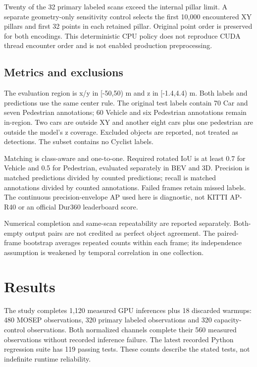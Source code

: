 \documentclass[11pt,a4paper]{article}
\begin{document}
Twenty of the 32 primary labeled scans exceed the internal pillar limit. A
separate geometry-only sensitivity control selects the first 10,000 encountered
XY pillars and first 32 points in each retained pillar. Original point order is
preserved for both encodings. This deterministic CPU policy does not reproduce
CUDA thread encounter order and is not enabled production preprocessing.

\subsection{Metrics and exclusions}
The evaluation region is x/y in [-50,50) m and z in [-1.4,4.4) m. Both labels and
predictions use the same center rule. The original test labels contain 70 Car
and seven Pedestrian annotations; 60 Vehicle and six Pedestrian annotations
remain in-region. Two cars are outside XY and another eight cars plus one
pedestrian are outside the model's z coverage. Excluded objects are reported,
not treated as detections. The subset contains no Cyclist labels.

Matching is class-aware and one-to-one. Required rotated IoU is at least 0.7
for Vehicle and 0.5 for Pedestrian, evaluated separately in BEV and 3D.
Precision is matched predictions divided by counted predictions; recall is
matched annotations divided by counted annotations. Failed frames retain
missed labels. The continuous precision-envelope AP used here is diagnostic,
not KITTI AP-R40 or an official Dur360 leaderboard score.

Numerical completion and same-scan repeatability are reported separately.
Both-empty output pairs are not credited as perfect object agreement. The
paired-frame bootstrap averages repeated counts within each frame; its
independence assumption is weakened by temporal correlation in one collection.

\section{Results}
The study completes 1,120 measured GPU inferences plus 18 discarded warmups:
480 MOSEP observations, 320 primary labeled observations and 320 capacity-control
observations. Both normalized channels complete their 560 measured observations
without recorded inference failure. The latest recorded Python regression suite
has 119 passing tests. These counts describe the stated tests, not indefinite
runtime reliability.
\end{document}
